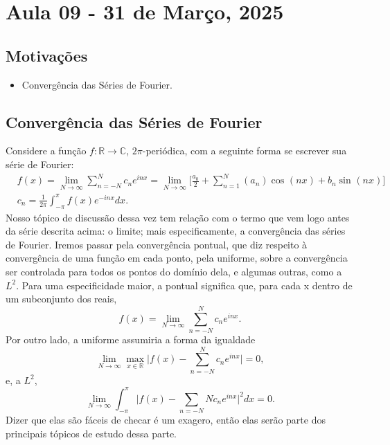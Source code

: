 \documentclass[../pde_notes.tex]{subfiles}
\begin{document}
\section{Aula 09 - 31 de Março, 2025}
\subsection{Motivações}
\begin{itemize}
	\item Convergência das Séries de Fourier.
\end{itemize}
\subsection{Convergência das Séries de Fourier}
Considere a função \(f:\mathbb{R}\rightarrow \mathbb{C}\), \(2\pi \)-periódica, com a seguinte forma se escrever sua série de Fourier:
\begin{align*}
	 & f(x)=\lim_{N\to \infty}\sum\limits_{n=-N}^{N}c_{n}e^{inx} = \lim_{N\to \infty}\biggl[\frac{a_{0}}{2}+\sum\limits_{n=1}^{N}(a_{n})\cos^{}{(nx)}+b_{n}\sin^{}{(nx)}\biggr] \\
	 & c_{n}=\frac{1}{2\pi }\int_{-\pi }^{\pi }f(x)e^{-inx}dx.
\end{align*}
Nosso tópico de discussão dessa vez tem relação com o termo que vem logo antes da série descrita acima: o limite; mais especificamente, a convergência das séries de Fourier. Iremos passar pela convergência pontual, que diz respeito à convergência de uma função em cada ponto, pela uniforme, sobre a convergência ser controlada para todos os pontos do domínio dela, e algumas outras, como a \(L^{2}\). Para uma especificidade maior, a pontual significa que, para cada x dentro de um subconjunto dos reais,
\[
	f(x)=\lim_{N\to \infty}\sum\limits_{n=-N}^{N}c_{n}e^{inx}.
\]
Por outro lado, a uniforme assumiria a forma da igualdade
\[
	\lim_{N\to \infty}\max_{x\in \mathbb{R}}\biggl\vert f(x)-\sum\limits_{n=-N}^{N}c_{n}e^{inx} \biggr\vert=0,
\]
e, a \(L^{2}\),
\[
	\lim_{N\to \infty}\int_{-\pi }^{\pi }\biggl\vert f(x)-\sum\limits_{n=-N}{N}c_{n}e^{inx} \biggr\vert^{2} dx = 0.
\]
Dizer que elas são fáceis de checar é um exagero, então elas serão parte dos principais tópicos de estudo dessa parte.
\end{document}
